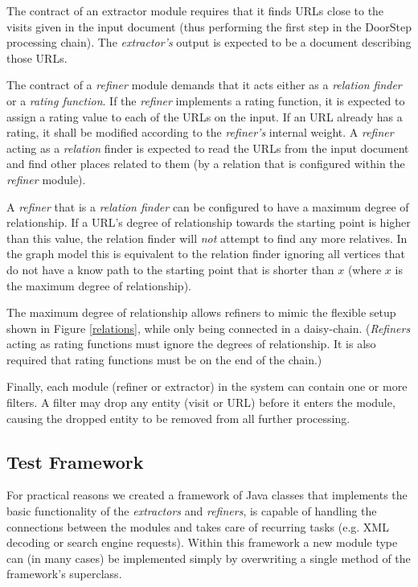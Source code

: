 \documentclass[a4paper]{danarticle}
\theoremstyle{remark}
\begin{document}
      The contract of 
      an extractor module requires that it finds URLs close to the visits given 
      in the input document (thus performing the first step in the DoorStep 
      processing chain). The \textit{extractor's} output is expected to be a 
      document describing those URLs. 
      
      The contract of a \textit{refiner} module 
      demands that it acts either as a \textit{relation finder} or a 
      \textit{rating function}. If the \textit{refiner} implements a rating 
      function, it is expected to assign a rating value to each of the URLs on 
      the input. If an URL already has a rating, it shall be modified according 
      to the \textit{refiner's} internal weight. A \textit{refiner} acting as a 
      \textit{relation} finder is expected to read the URLs from the input 
      document and find other places related to them (by a relation that is 
      configured within the \textit{refiner} module).
      
      A \textit{refiner} that is a \textit{relation finder} can be configured 
      to have a maximum degree of relationship. If a URL's degree of
      relationship towards the starting point is higher than this
      value, the relation finder will \emph{not} attempt to find
      any more relatives. In the graph model this is equivalent to the relation
      finder ignoring all vertices that do not have a know path to the starting
      point that is shorter than $ x $  (where $ x $ is the maximum degree of
      relationship).
      
      The maximum degree of relationship allows refiners to mimic the flexible 
      setup shown in 
      Figure \ref{relations}, while only being
      connected in a daisy-chain. (\textit{Refiners} acting as rating 
      functions must ignore the degrees of relationship. It is also required 
      that rating functions must be on the end of the chain.)
      
      Finally, each module (refiner or extractor) in the system can contain one
      or more 
      filters. A filter may drop any entity (visit or URL) before it enters the
      module, causing the dropped entity to be removed from all further
      processing.
    \subsection{Test Framework}
      For practical reasons we created a framework of Java classes that 
      implements the basic functionality of the \textit{extractors} and 
      \textit{refiners}, is capable of handling the connections between the 
      modules and takes care of recurring tasks (e.g. XML decoding or search 
      engine requests). Within this framework a new module type can (in many 
      cases) be implemented simply by overwriting a single method of the 
      framework's superclass.
      
\end{document}
